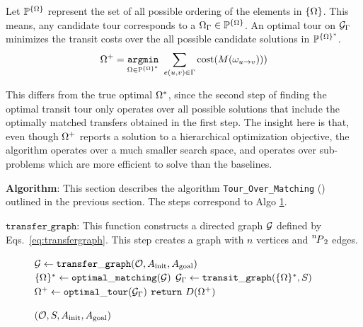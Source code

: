 Let $ \mathbb{P}^{\scomaset} $ represent the set of all possible ordering of the elements in $ \scomaset $. This means, any candidate tour corresponds to a $ \scoma_\tour\in\mathbb{P}^{\scomaset} $. An optimal tour on $ \tspgraph $ minimizes the transit costs over the all possible candidate solutions in  $ \mathbb{P}^{\scomaset^*} $.
\vspace{-0.1in}
\begin{equation}
\scoma^+ = \underset{ \scoma \in  \mathbb{P}^{\scomaset^*}   }{ \mathtt{argmin} } \ \sum_{e(u,v)\in\tour}\cost({M}( \coma_{u\rightarrow v} ))  )
\vspace{-0.05in}
\end{equation}

This differs from the true optimal $ \scoma^* $, since the second step of finding the optimal transit tour only operates over all possible solutions that include the optimally matched transfers obtained in the first step.
The insight here is that, even though $ \scoma^+ $ reports a solution to a hierarchical optimization objective, the algorithm operates over a much smaller search space, and operates over sub-problems which are more efficient to solve than the baselines.\\


\vspace{-0.1in}

\noindent\textbf{Algorithm}: This section describes the algorithm {\tt {Tour\_Over\_Matching}} (\algo) outlined in the previous section. The steps correspond to Algo \ref{algo:tom}. 

\noindent $ \mathtt{transfer\_graph} $: This function constructs a directed graph $ \graph $ defined by Eqs.~\ref{eq:transfergraph}. This step creates a graph with $ n $ vertices and $ \permu[n]{2} $ edges.

\begin{figure}\vspace{-0.3in}
  \begin{minipage}{0.6\textwidth}
  \vspace{0pt} 
    \begin{algorithm}[H]
    \caption{{\tt \algo}$ (\objectset, \startq, \ainit, \atarget) $}
    \label{algo:tom}
    $ \graph \leftarrow \mathtt{transfer\_graph}(\objectset, \ainit, \atarget) $\;
    $ \scomaset^* \leftarrow \mathtt{optimal\_matching}(\graph) $\;
    $ \tspgraph \leftarrow \mathtt{transit\_graph}(\scomaset^*, \startq) $\;
    $ \scoma^+\leftarrow\mathtt{optimal\_tour}(\tspgraph) $\;
    $ \mathbf{\mathtt{return}}\ \trajset(\scoma^+)$\;
    \end{algorithm}
  \end{minipage}
  \vspace{-0.3in}
\end{figure}

